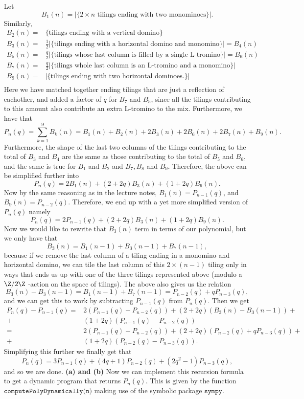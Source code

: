 \documentclass[11pt,a4paper]{article}
\begin{document}
Let $$
B_1(n) = \left|\{2\times n \text{ tilings ending with two
monominoes}\}\right|.
$$
Similarly,
\begin{align*}
B_2(n) =& \{\text{tilings ending with a vertical domino}\} \\
B_3(n) = & \frac{1}{2} \left|\{\text{tilings ending with a horizontal domino and monomino}\}\right| = B_4(n) \\
B_5(n) = & \frac{q}{2} \left| \{ \text{tilings whose last column is filled by a single L-tromino} \}\right| = B_6(n)\\
B_7(n) =& \frac{q}{2}\left|\{ \text{tilings whole last column is an L-tromino and a monomino}\}\right| \\
 B_9(n) = & \left|\{\text{tilings ending with two horizontal dominoes.}\}\right| \\
\end{align*}
Here we have matched together ending tilings that are just a
 reflection of eachother, and added a factor of $q$ for $B_7$ and
 $B_5$, since all the tilings contributing to this amount also contribute an extra L-tromino to the mix. Furthermore, we have that \[
 P_{n}(q) = \sum_{k=1}^{9} B_{k}(n) = B_1(n) + B_2(n) + 2B_3(n) + 2B_6(n) + 2B_7(n) + B_9(n).
 \]
Furthermore, the shape of the last two columns of the tilings contributing to the total of $B_3$ and $B_4$ are the same as those contributing to the total of $B_5$ and $B_6$, and the same is true for $B_1$ and $B_2$ and $B_7, B_8$ and $B_9$. Therefore, 
the above can be simplified further into \[
P_{n}(q) = 2B_1(n) + (2 + 2q)B_3(n) + (1 + 2q)B_9(n).
\] 
Now by the same reasoning as in the lecture notes, $B_1(n) = P_{n-1}(q)$, and 
$B_9(n) = P_{n-2}(q)$.  Therefore, we end up with a yet more simplified version of $P_{n}(q)$ namely \[
P_{n}(q) = 2P_{n-1}(q) + (2+ 2q)B_3(n) + (1+2q) B_9(n).
\] 
Now we would like to rewrite that $B_3(n)$ term in terms of our polynomial, 
but we only have that \[
B_3(n) = B_1(n-1) + B_3(n-1) + B_7(n-1),
\] because if we remove the last column of a tiling ending in a monomino and horizontal domino, we can tile the last column of this $2\times (n-1)$ tiling only in ways that ends us up with one of the three tilings represented above (modulo a $\Z /2\Z$ -action on the space of tilings). The above also gives us the relation  
\[
B_3(n) - B_3(n-1) = B_1(n-1) + B_7(n-1) = P_{n-2}(q) + qP_{n-3}(q),
\] and we can get this to work by subtracting $P_{n-1}(q)$ from 
$P_{n}(q)$. Then we get 
\begin{align*}
P_{n}(q) - P_{n-1}(q) = & 2(P_{n-1}(q) - P_{n-2}(q)) + (2+2q)(B_3(n) - B_3(n-1)) + \\
 +& (1+2q)(P_{n-1}(q) - P_{n-2}(q)) \\
=& 2(P_{n-1}(q) - P_{n-2}(q)) + (2+2q)(P_{n-2}(q) + qP_{n-3}(q)) + \\
+& (1+2q)(P_{n-2}(q) - P_{n-3}(q)).
\end{align*}
Simplifying this further we finally get that \[
P_{n}(q) = 3P_{n-1}(q) + (4q +1)P_{n-2}(q) + (2q^2 - 1)P_{n-3}(q),
\] and so we are done.
\noindent \textbf{(a) and (b)} Now we can implement this recursion formula to get a dynamic program that returns $P_{n}(q).$ This is given by the function \newline 
$\texttt{computePolyDynamically(n)}$ making use of the symbolic package $\texttt{sympy}$.
\end{document}
